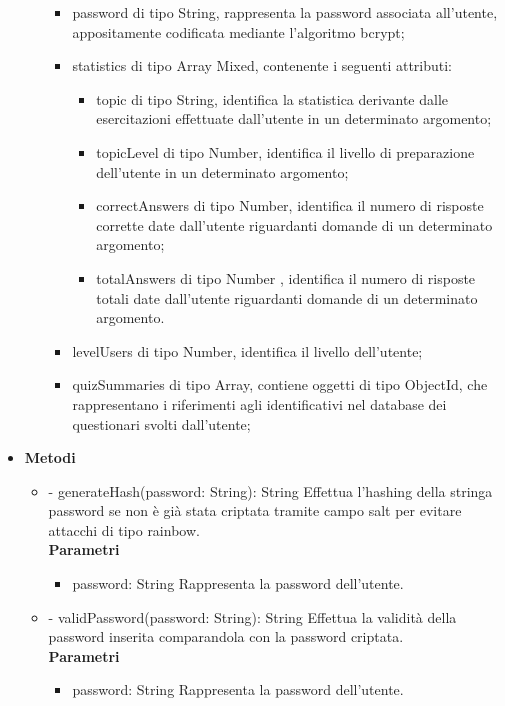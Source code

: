 \begin{itemize}
\begin{itemize}
\begin{itemize}
				\item
					password di tipo String, rappresenta la password associata all'utente,    appositamente codificata mediante l'algoritmo bcrypt;  		
				\item
					statistics di tipo Array Mixed, contenente i seguenti attributi:
				\begin{itemize}
					\item
						topic di tipo String, identifica la statistica derivante dalle esercitazioni effettuate dall'utente in un determinato argomento; 
					\item
						 topicLevel di tipo Number, identifica il livello di preparazione dell'utente in un determinato argomento;
					\item
						correctAnswers di tipo Number, identifica il numero di risposte corrette date dall'utente riguardanti domande di un determinato argomento; 
					\item						
						 totalAnswers di tipo Number	, identifica il numero di risposte totali date dall'utente riguardanti domande di un determinato argomento.		
				\end{itemize}		
				\item 
					levelUsers di tipo Number, identifica il livello dell'utente;				
				
				\item
					quizSummaries di tipo Array, contiene oggetti di tipo ObjectId, che rappresentano i riferimenti agli identificativi nel database dei questionari svolti dall'utente;		
			\end{itemize}	
		\end{itemize}	
	\item \textbf{Metodi} \\
		\begin{itemize}
		\item
		- generateHash(password: String): String
		Effettua l'hashing della stringa password se non è già stata criptata tramite campo salt per evitare attacchi di tipo rainbow. \\
		\textbf{Parametri} \\
			\begin{itemize}
			\item
				 password: String
				Rappresenta la password dell'utente.
			\end{itemize}
		\item
		- validPassword(password: String): String 
		Effettua la validità della password inserita comparandola con la password criptata.	\\
		\textbf{Parametri} \\
			\begin{itemize}
			\item
				 password: String
				Rappresenta la password dell'utente.
			\end{itemize}
		\end{itemize}	
\end{itemize}